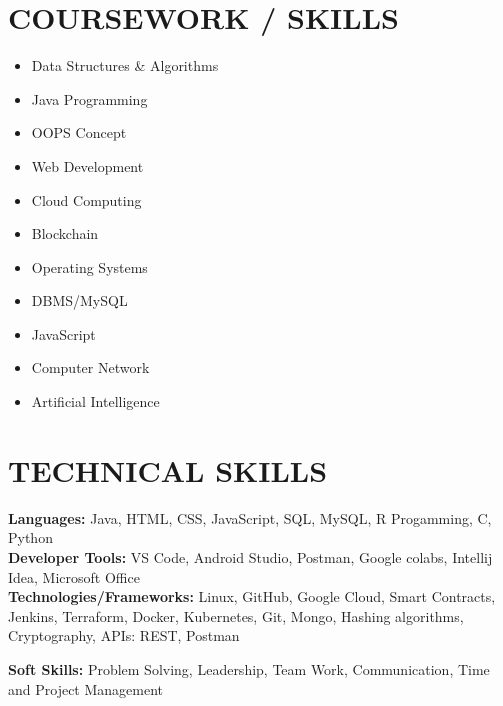 \documentclass[letterpaper,11pt]{article}
\newcommand{\resumeSubHeadingListStart}{\begin{itemize}[leftmargin=0.0in, label={}]}
\newcommand{\resumeSubHeadingListEnd}{\end{itemize}}
\begin{document}
\section{COURSEWORK / SKILLS}
        \begin{multicols}{4}
            \begin{itemize}[itemsep=-2pt, parsep=5pt]
                \item Data Structures \& Algorithms
                \item Java Programming
                \item OOPS Concept
                \item Web Development
                \item Cloud Computing
                \item Blockchain
                \item Operating Systems
                \item DBMS/MySQL
                \item JavaScript
                \item Computer Network
                \item Artificial Intelligence
                
            \end{itemize}
        \end{multicols}
        \vspace*{2.0\multicolsep}


\section{TECHNICAL SKILLS}
 \begin{itemize}[leftmargin=0.15in, label={}]
    \small{\item{
     \textbf{\normalsize{Languages:}}{ \normalsize{Java, HTML, CSS, JavaScript, SQL, MySQL, R Progamming, C, Python}} \vspace{4pt}\\
     
     \textbf{\normalsize{Developer Tools:}}{ \normalsize{VS Code, Android Studio, Postman, Google colabs, Intellij Idea, Microsoft Office }} \vspace{4pt}\\
     
     \textbf{\normalsize{Technologies/Frameworks:}}{\normalsize{ Linux, GitHub, Google Cloud, Smart Contracts, Jenkins, Terraform, Docker, Kubernetes, Git, Mongo, Hashing algorithms, Cryptography, APIs: REST, Postman}} \\
     \vspace{5pt}
     
     \textbf{\normalsize{Soft Skills:}}{ \normalsize{Problem Solving, Leadership, Team Work, Communication, Time and Project Management }} \vspace{4pt}\\

     
    }}
 \end{itemize}
 \vspace{-15pt}
\end{document}

